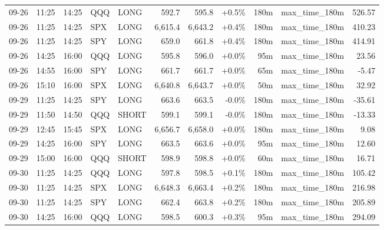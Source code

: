 \documentclass[11pt,a4paper,twoside]{article}
\begin{document}
\begin{center}
\begin{longtable}{>{\color{txtmain}}l l l l l r r r r >{\color{txtmain}}l r}
09-26 & 11:25 & 14:25 & QQQ & LONG & 592.7 & 595.8 & \textcolor{wingreen}{+0.5\%} & 180m & max\_time\_180m & \textcolor{wingreen}{526.57} \\
09-26 & 11:25 & 14:25 & SPX & LONG & 6,615.4 & 6,643.2 & \textcolor{wingreen}{+0.4\%} & 180m & max\_time\_180m & \textcolor{wingreen}{410.23} \\
09-26 & 11:25 & 14:25 & SPY & LONG & 659.0 & 661.8 & \textcolor{wingreen}{+0.4\%} & 180m & max\_time\_180m & \textcolor{wingreen}{414.91} \\
09-26 & 14:25 & 16:00 & QQQ & LONG & 595.8 & 596.0 & \textcolor{wingreen}{+0.0\%} & 95m & max\_time\_180m & \textcolor{wingreen}{23.56} \\
09-26 & 14:55 & 16:00 & SPY & LONG & 661.7 & 661.7 & \textcolor{wingreen}{+0.0\%} & 65m & max\_time\_180m & \textcolor{lossred}{-5.47} \\
09-26 & 15:10 & 16:00 & SPX & LONG & 6,640.8 & 6,643.7 & \textcolor{wingreen}{+0.0\%} & 50m & max\_time\_180m & \textcolor{wingreen}{32.92} \\
09-29 & 11:25 & 14:25 & SPY & LONG & 663.6 & 663.5 & \textcolor{lossred}{-0.0\%} & 180m & max\_time\_180m & \textcolor{lossred}{-35.61} \\
09-29 & 11:50 & 14:50 & QQQ & SHORT & 599.1 & 599.1 & \textcolor{lossred}{-0.0\%} & 180m & max\_time\_180m & \textcolor{lossred}{-13.33} \\
09-29 & 12:45 & 15:45 & SPX & LONG & 6,656.7 & 6,658.0 & \textcolor{wingreen}{+0.0\%} & 180m & max\_time\_180m & \textcolor{wingreen}{9.08} \\
09-29 & 14:25 & 16:00 & SPY & LONG & 663.5 & 663.6 & \textcolor{wingreen}{+0.0\%} & 95m & max\_time\_180m & \textcolor{wingreen}{12.60} \\
09-29 & 15:00 & 16:00 & QQQ & SHORT & 598.9 & 598.8 & \textcolor{wingreen}{+0.0\%} & 60m & max\_time\_180m & \textcolor{wingreen}{16.71} \\
09-30 & 11:25 & 14:25 & QQQ & LONG & 597.8 & 598.5 & \textcolor{wingreen}{+0.1\%} & 180m & max\_time\_180m & \textcolor{wingreen}{105.42} \\
09-30 & 11:25 & 14:25 & SPX & LONG & 6,648.3 & 6,663.4 & \textcolor{wingreen}{+0.2\%} & 180m & max\_time\_180m & \textcolor{wingreen}{216.98} \\
09-30 & 11:25 & 14:25 & SPY & LONG & 662.4 & 663.8 & \textcolor{wingreen}{+0.2\%} & 180m & max\_time\_180m & \textcolor{wingreen}{205.89} \\
09-30 & 14:25 & 16:00 & QQQ & LONG & 598.5 & 600.3 & \textcolor{wingreen}{+0.3\%} & 95m & max\_time\_180m & \textcolor{wingreen}{294.09} \\

\end{longtable}
\end{center}
\end{document}
